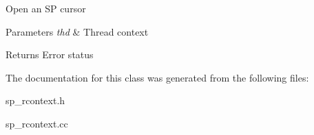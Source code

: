 Open an SP cursor


\begin{DoxyParams}{Parameters}
{\em thd} & Thread context\\
\hline
\end{DoxyParams}
\begin{DoxyReturn}{Returns}
Error status 
\end{DoxyReturn}


The documentation for this class was generated from the following files\+:\begin{DoxyCompactItemize}
\item 
sp\+\_\+rcontext.\+h\item 
sp\+\_\+rcontext.\+cc\end{DoxyCompactItemize}
